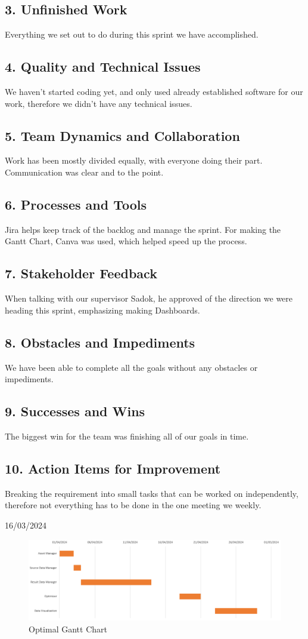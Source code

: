 \documentclass[12pt]{report}
\begin{document}
\subsection*{3. Unfinished Work}
Everything we set out to do during this sprint we have accomplished.
\subsection*{4. Quality and Technical Issues}
We haven't started coding yet, and only used already established software for our work, therefore we didn't have any technical issues.
\subsection*{5. Team Dynamics and Collaboration}
Work has been mostly divided equally, with everyone doing their part. Communication was clear and to the point.
\subsection*{6. Processes and Tools}
Jira helps keep track of the backlog and manage the sprint. For making the Gantt Chart, Canva was used, which helped speed up the process.
\subsection*{7. Stakeholder Feedback}
When talking with our supervisor Sadok, he approved of the direction we were heading this sprint, emphasizing making Dashboards.
\subsection*{8. Obstacles and Impediments}
We have been able to complete all the goals without any obstacles or impediments.
\subsection*{9. Successes and Wins}
The biggest win for the team was finishing all of our goals in time.
\subsection*{10. Action Items for Improvement}
Breaking the requirement into small tasks that can be worked on independently, therefore not everything has to be done in the one meeting we weekly.

\hfill 16/03/2024


\begin{figure}[H]
  \centering
  \includegraphics[width=1\textwidth]{Resources/1-Sprint/Gantt-Chart-Optimal.png}
  \caption{Optimal Gantt Chart}
  \label{fig:OptGanttChart-image}
\end{figure}
\end{document}
